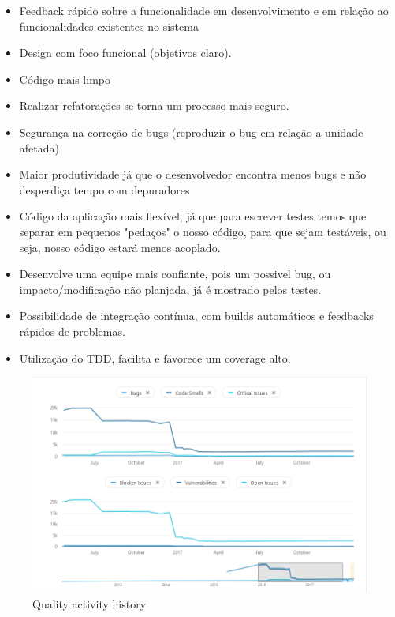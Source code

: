 \documentclass[12pt]{article}
\begin{document}
\begin{itemize}
	\item Feedback rápido sobre a funcionalidade em desenvolvimento e em relação ao funcionalidades existentes no sistema
	\item Design com foco funcional (objetivos claro).
	\item Código mais limpo
	\item Realizar refatorações se torna um processo mais seguro.
	\item Segurança na correção de bugs (reproduzir o bug em relação a unidade afetada)
	\item Maior produtividade já que o desenvolvedor encontra menos bugs e não desperdiça tempo com depuradores
	\item Código da aplicação mais flexível, já que para escrever testes temos que separar em pequenos "pedaços" o nosso código, para que sejam testáveis, ou seja, nosso código estará menos acoplado.
	\item Desenvolve uma equipe mais confiante, pois um possivel bug, ou impacto/modificação não planjada, já é mostrado pelos testes.
	\item Possibilidade de integração contínua, com builds automáticos e feedbacks rápidos de problemas.
	\item Utilização do TDD, facilita e favorece um coverage alto.
\end{itemize}

\begin{figure}[h]
	\centering
		\includegraphics[scale=0.5]{img/sonar-PMD-activity.png}
	\caption{Quality activity history}
	\label{fig:sonar-activity-history}
\end{figure}
\end{document}
